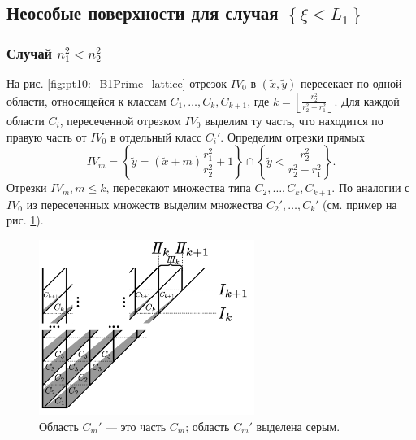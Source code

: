 \subsection{Неособые поверхности для случая $\left\{\xi < L_1\right\}$}\label{s3.8}
\subsubsection{Случай $n_1^2<n_2^2$}\label{s3.8.1}
На рис. \ref{fig:pt10:_B1Prime_lattice} отрезок $IV_0$ в $(\widetilde{x}, \widetilde{y})$
пересекает по одной области, относящейся к классам $C_1, \ldots, C_k, C_{k+1}$, где $k = \left \lfloor \frac{r_2^2}{r_2^2 - r_1^2} \right \rfloor$. 
Для каждой области  $C_i$, пересеченной отрезком $IV_0$ выделим ту часть, что находится по правую часть от $IV_0$  в отдельный класс $C_i'$.
Определим отрезки прямых 
\begin{equation}
IV_m =  \left\{ \widetilde{y} = (\widetilde{x} + m) \frac{r_1^2}{r_2^2} + 1 \right\} \cap \left\{\widetilde{y}< \frac{r_2^2}{r_2^2-r_1^2}\right\}.
\label{eq:IVdef}
\end{equation} 
Отрезки $IV_m, m \leq k$, пересекают множества типа $C_2, \ldots, C_k, C_{k+1}$. По аналогии с $IV_0$ из пересеченных множеств выделим множества  $C_2', \ldots, C_k'$ (см. пример на рис. \ref{fig:pt10:_C_kPrime_definitions}).

\begin{figure}[!htb]
\centering
\includegraphics[width=7cm]{images/section3_circular/atoms/branching/C_kPrime_definitions.pdf}
    \caption{Область $C_m'$ --- это часть $C_m$; область $C_m'$ выделена серым.}
    \label{fig:pt10:_C_kPrime_definitions}
\end{figure}

